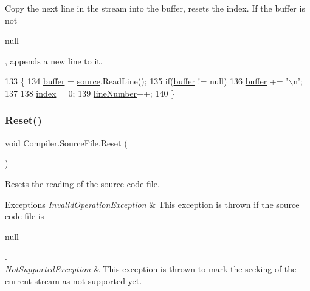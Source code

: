 Copy the next line in the stream into the buffer, resets the index. If the buffer is not
\begin{DoxyCode}
null 
\end{DoxyCode}
 , appends a new line to it. 
\begin{DoxyCode}
133                                         \{
134                     \mbox{\hyperlink{class_compiler_1_1_source_file_a6ac27509abd78029bf3881636983ab48}{buffer}} = \mbox{\hyperlink{class_compiler_1_1_source_file_a46db9fe024d4cf1e282e6afafea8c4b2}{source}}.ReadLine();
135                     \textcolor{keywordflow}{if}(\mbox{\hyperlink{class_compiler_1_1_source_file_a6ac27509abd78029bf3881636983ab48}{buffer}} != null)
136                         \mbox{\hyperlink{class_compiler_1_1_source_file_a6ac27509abd78029bf3881636983ab48}{buffer}} += \textcolor{charliteral}{'\(\backslash\)n'};
137 
138                     \mbox{\hyperlink{class_compiler_1_1_source_file_a46a2996b918f0b2f795449879663cfe5}{index}} = 0;
139                     \mbox{\hyperlink{class_compiler_1_1_source_file_a9fea4fc4a3640f2f88db7d2e8be3db70}{lineNumber}}++;
140                 \}
\end{DoxyCode}
\mbox{\label{class_compiler_1_1_source_file_aa64348e54dbb048b3ec58ce3d355e014}} 
\subsubsection{\texorpdfstring{Reset()}{Reset()}}
{\footnotesize\ttfamily void Compiler.\+Source\+File.\+Reset (\begin{DoxyParamCaption}{ }\end{DoxyParamCaption})}

Resets the reading of the source code file. 
\begin{DoxyExceptions}{Exceptions}
{\em Invalid\+Operation\+Exception} & This exception is thrown if the source code file is
\begin{DoxyCode}
null 
\end{DoxyCode}
 . \\
\hline
{\em Not\+Supported\+Exception} & This exception is thrown to mark the seeking of the current stream as not supported yet. \\
\hline
\end{DoxyExceptions}

